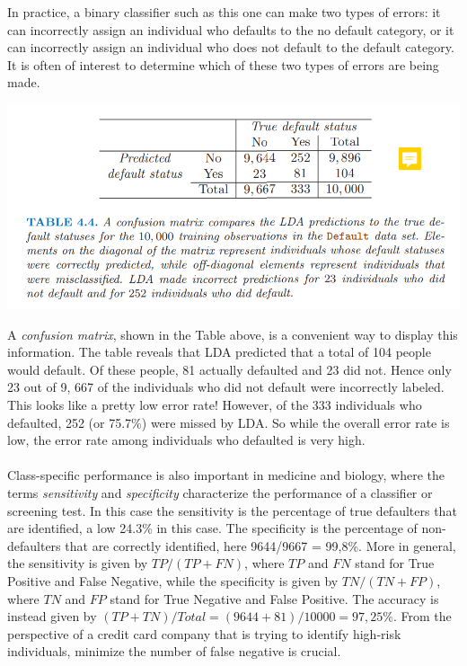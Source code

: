 In practice, a binary classifier such as this one can make two types of
errors: it can incorrectly assign an individual who defaults to the no default category, or it can incorrectly assign an individual who does not default to the default category. It is often of interest to determine which of these two types of errors are being made.
\begin{center}
    \includegraphics[scale=0.8]{images/confusion-matrix.png}
\end{center}
A \textit{confusion matrix}, shown in the Table above, is a convenient way to display this information. The table reveals that LDA predicted that a total of 104 people would default. Of these people, 81 actually defaulted and 23 did not. Hence only 23 out of 9, 667 of the individuals who did not default were incorrectly labeled. This looks like a pretty low error rate! However, of the 333 individuals who defaulted, 252 (or 75.7\%) were missed by LDA. So while the overall error rate is low, the error rate among individuals who defaulted is very high.\\\\
Class-specific performance is also important in medicine and biology,
where the terms \textit{sensitivity} and \textit{specificity} characterize the performance of a classifier or screening test. In this case the sensitivity is the percentage of true defaulters that are identified, a low 24.3\% in this case. The specificity is the percentage of non-defaulters that are correctly identified, here 9644/9667 = 99,8\%. More in general, the sensitivity is given by $TP/(TP + FN)$, where $TP$ and $FN$ stand for True Positive and False Negative, while the specificity is given by $TN/(TN + FP)$, where $TN$ and $FP$ stand for True Negative and False Positive. The accuracy is instead given by $(TP + TN) / Total = (9644 + 81) / 10000 = 97,25\%$. From the perspective of a credit card company that is trying to identify high-risk individuals, minimize the number of false negative is crucial.\\\\
